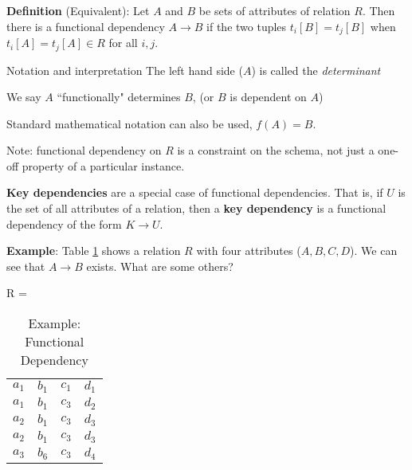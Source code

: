 \documentclass{article}
\begin{document}
\begin{outline}
\1[] \textbf{Definition} (Equivalent):  Let $A$ and $B$ be sets of attributes of relation $R$.  Then there is a functional dependency  $A \to B$ if the two tuples $t_i[B] = t_j[B]$ when $t_i[A] =  t_j[A] \in R$ for all $i,j$.  
 
 
 \1 Notation and interpretation      
        \2 The left hand side ($A$) is called the \textit{determinant}
        
        \2 We say $A$ ``functionally" determines $B$, (or $B$ is dependent on $A$)

        \2 Standard mathematical notation can also be used, $f(A) = B$. 
        
        \2 Note: functional dependency on $R$ is a constraint on the schema, not just a one-off property of a particular instance.   

        \2 \textbf{Key dependencies} are a special case of functional dependencies.  That is, if $U$ is the set of all attributes of a relation, then a \textbf{key dependency} is a functional dependency of the form $K \to U$.  

\1 \textbf{Example}: Table \ref{tab:xfd} shows a relation $R$ with four attributes ($A, B, C, D$).  We can see that $A \to B$ exists.  What are some others?    
  
 
\begin{table}[h!]
\caption{Example: Functional Dependency}
\begin{center}

R = \begin{tabular}{|c|c|c|c|}
   \hline
  \cellcolor{excel}{A}  & \cellcolor{excel}{B}  &   \cellcolor{excel}{C}
&  \cellcolor{excel}{D}  \\
  \hline
        $a_1$ & $b_1$ & $c_1$  &   $d_1$ \\\hline
        
        $a_1$ & $b_1$ & $c_3$  &   $d_2$ \\\hline
        
         $a_2$ & $b_1$ & $c_3$  &   $d_3$ \\\hline
         
        $a_2$ & $b_1$ & $c_3$  &   $d_3$ \\\hline
         
        $a_3$ & $b_6$ & $c_3$  &   $d_4$ \\\hline
         
\end{tabular}
\end{center}
\label{tab:xfd}
\end{table}%
% 
%
%
%
 



\end{outline}
\end{document}
